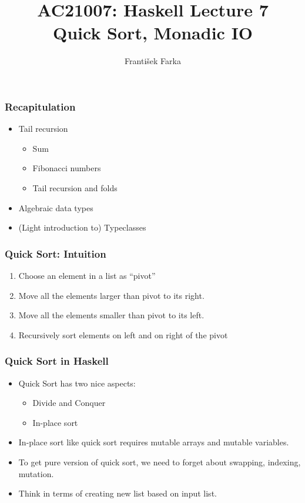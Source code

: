\documentclass[final,handout]{beamer}
\title[Haskell Lecture 7]{AC21007: Haskell Lecture 7\\
    Quick Sort,
    Monadic IO
}
\author[Franti\v{s}ek Farka]{Franti\v{s}ek Farka}
\date{}
\newcommand\BackgroundPicture[1]{%
  \setbeamertemplate{background}{%
   \parbox[c][\paperheight]{\paperwidth}{%
      \vfill \hfill
\texttt{[image: \#1]}
        \hfill \vfill
     }}}
\begin{document}
\BackgroundPicture{fondo1.png}
\begin{frame}
\titlepage
\end{frame}

\begin{frame}[fragile]
    \frametitle{Recapitulation}

    \begin{itemize}
        \item Tail recursion
            \begin{itemize}
                \item Sum
                \item Fibonacci numbers
                \item Tail recursion and folds
            \end{itemize}
        \item Algebraic data types
        \item (Light introduction to) Typeclasses
  \end{itemize}
\end{frame}  


\begin{frame}[fragile]
    \frametitle{Quick Sort: Intuition}

    \begin{enumerate}
        \item Choose an element in a list as ``pivot''
        \item Move all the elements larger than pivot to its right.
        \item Move all the elements smaller than pivot to its left.
        \item Recursively sort elements on left and on right of the pivot
    \end{enumerate}
\end{frame}

\begin{frame}[fragile]
    \frametitle{Quick Sort in Haskell}

    \begin{itemize}
        \item Quick Sort has two nice aspects:
            \begin{itemize}
                \item Divide and Conquer
                \item In-place sort
            \end{itemize}
        \item<2-> In-place sort like quick sort requires mutable arrays and
             mutable variables.
        \item<3-> To get pure version of quick sort, we need to forget about
                swapping, indexing, mutation.
        \item<4-> Think in terms of creating new list based on input list.
    \end{itemize}
\end{frame}
\end{document}
